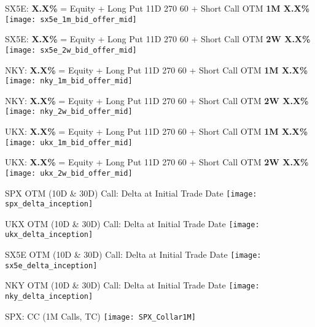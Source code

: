 \documentclass{beamer}
\begin{document}
\begin{frame}{\small SX5E: {\bf X.X\%} = Equity + Long Put 11D 270 60 + Short Call OTM {\bf 1M X.X\%}}
\texttt{[image: sx5e\_1m\_bid\_offer\_mid]}
\end{frame}
\begin{frame}{\small SX5E: {\bf X.X\%} = Equity + Long Put 11D 270 60 + Short Call OTM {\bf 2W X.X\%}}
\texttt{[image: sx5e\_2w\_bid\_offer\_mid]}
\end{frame}

\begin{frame}{\small NKY: {\bf X.X\%} = Equity + Long Put 11D 270 60 + Short Call OTM {\bf 1M X.X\%}}
\texttt{[image: nky\_1m\_bid\_offer\_mid]}
\end{frame}
\begin{frame}{\small NKY: {\bf X.X\%} = Equity + Long Put 11D 270 60 + Short Call OTM {\bf 2W X.X\%}}
\texttt{[image: nky\_2w\_bid\_offer\_mid]}
\end{frame}

\begin{frame}{\small UKX: {\bf X.X\%} = Equity + Long Put 11D 270 60 + Short Call OTM {\bf 1M X.X\%}}
\texttt{[image: ukx\_1m\_bid\_offer\_mid]}
\end{frame}
\begin{frame}{\small UKX: {\bf X.X\%} = Equity + Long Put 11D 270 60 + Short Call OTM {\bf 2W X.X\%}}
\texttt{[image: ukx\_2w\_bid\_offer\_mid]}
\end{frame}

\begin{frame}{SPX OTM (10D \& 30D) Call: Delta at Initial Trade Date}
\texttt{[image: spx\_delta\_inception]}
\end{frame}
\begin{frame}{UKX OTM (10D \& 30D) Call: Delta at Initial Trade Date}
\texttt{[image: ukx\_delta\_inception]}
\end{frame}
\begin{frame}{SX5E OTM (10D \& 30D) Call: Delta at Initial Trade Date}
\texttt{[image: sx5e\_delta\_inception]}
\end{frame}
\begin{frame}{NKY OTM (10D \& 30D) Call: Delta at Initial Trade Date}
\texttt{[image: nky\_delta\_inception]}
\end{frame}

\begin{frame}{SPX: CC (1M Calls, TC)}
\texttt{[image: SPX\_Collar1M]}
\end{frame}
\end{document}
